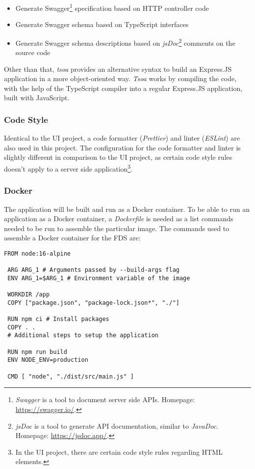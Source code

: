    \begin{itemize}
    \item Generate Swagger\footnote{\emph{Swagger} is a tool to document server side APIs. Homepage: \url{https://swagger.io/}.} specification based on HTTP controller code
    \item Generate Swagger schema based on TypeScript interfaces
    \item Generate Swagger schema descriptions based on \emph{jsDoc}\footnote{\emph{jsDoc} is a tool to generate API documentation, similar to \emph{JavaDoc}. Homepage: \url{https://jsdoc.app/}.} comments on the source code
   \end{itemize}
  
  Other than that, \emph{tsoa} provides an alternative syntax to build an Express.JS application in a more object-oriented way. \emph{Tsoa} works by compiling the code, with the help of the TypeScript compiler into a regular Express.JS application, built with JavaScript. 

  \subsubsection{Code Style}
  Identical to the UI project, a code formatter (\emph{Prettier}) and linter (\emph{ESLint}) are also used in this project. The configuration for the code formatter and linter is slightly different in comparison to the UI project, as certain code style rules doesn't apply to a server side application\footnote{In the UI project, there are certain code style rules regarding HTML elements.}.

  \subsubsection{Docker}
  The application will be built and run as a Docker container. To be able to run an application as a Docker container, a \emph{Dockerfile} is needed as a list commands needed to be run to assemble the particular image. The commands used to assemble a Docker container for the FDS are:

   \begin{lstlisting}[caption={Dockerfile for FDS (Docker)}, language=docker]
 FROM node:16-alpine

 ARG ARG_1 # Arguments passed by --build-args flag
 ENV ARG_1=$ARG_1 # Environment variable of the image

 WORKDIR /app
 COPY ["package.json", "package-lock.json*", "./"]

 RUN npm ci # Install packages
 COPY . .
 # Additional steps to setup the application

 RUN npm run build
 ENV NODE_ENV=production

 CMD [ "node", "./dist/src/main.js" ]
   \end{lstlisting}
  
